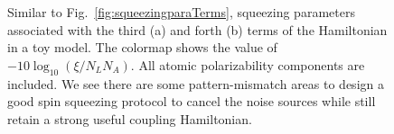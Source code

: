 \begin{figure}[!tbp]
\begin{minipage}{.91\linewidth}
\centering
{}
\end{minipage}
\par\medskip
\begin{minipage}{.91\linewidth}
\centering
{}
\end{minipage}
\caption[Squeezing parameters as a function of detuning and atom position with a full atomic polarizability.]{Similar to Fig.~\ref{fig:squeezingparaTerms}, squeezing parameters associated with the third (a) and forth (b) terms of the Hamiltonian in a toy model. The 
colormap shows the value of $ -10\log_{10}(\xi/N_LN_A) $.  All atomic polarizability components are included. We see there are some pattern-mismatch areas to design a good spin squeezing protocol to cancel the noise sources while still retain a strong useful coupling Hamiltonian.}
\label{fig:squeezingparaTerms_total}
\end{figure}

